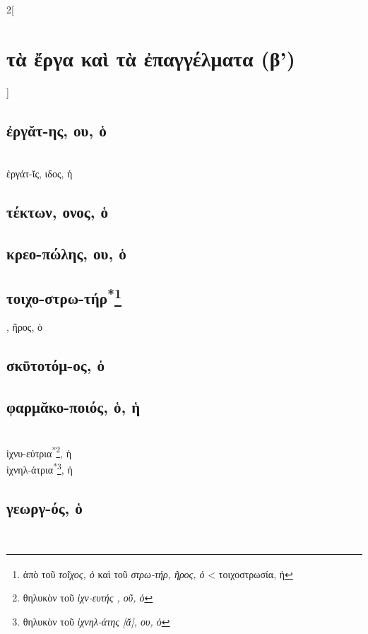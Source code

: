 \documentclass{book}
\begin{document}
\begin{multicols}{2}[\section{τὰ ἔργα καὶ τὰ ἐπαγγέλματα (β')}]
\subsection{ἐργᾰτ-ης, ου, ὁ}  ~\\
ἐργάτ-ῐς, ιδος, ἡ 
\subsection{τέκτων, ονος, ὁ}
\subsection{κρεο-πώλης, ου, ὁ}
\subsection{τοιχο-στρω-τήρ\textsuperscript{*}\protect\footnote{ἀπὸ τοῦ \emph{τοῖχος, ὁ} καὶ τοῦ \emph{στρω-τήρ, ῆρος, ὁ}
< τοιχοστρωσία\textsuperscript{\textdagger}, ἡ}}, ῆρος, ὁ  
\subsection{σκῡτοτόμ-ος, ὁ}
\subsection{φαρμᾰκο-ποιός, ὁ, ἡ}  %
 ~\\
ἰχνυ-εύτρια\textsuperscript{*}\protect\footnote{θηλυκὸν τοῦ \emph{ἰχν-ευτής , οῦ, ὁ}}, ἡ
 ~\\
ἰχνηλ-άτρια\textsuperscript{*}\protect\footnote{θηλυκὸν τοῦ \emph{ἰχνηλ-άτης [ᾰ], ου, ὁ}},  ἡ
\subsection{γεωργ-ός, ὁ}
~
\end{multicols}
\end{document}
